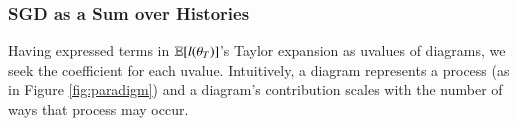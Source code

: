             \subsubsection{SGD as a Sum over Histories}\label{sect:histories}
            Having expressed terms in $\mathbb{E}[l(\theta_T)]$'s Taylor expansion %
            as uvalues of
            diagrams, we seek the coefficient for each uvalue.  Intuitively, a
            diagram represents a process (as in Figure \ref{fig:paradigm}) and
            a diagram's contribution scales with the number of ways that
            process may occur.
